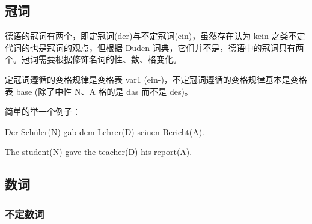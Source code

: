 \subsection{冠词}

德语的冠词有两个，即定冠词(der)与不定冠词(ein)，虽然存在认为 kein 之类不定代词的也是冠词的观点，但根据 Duden 词典，它们并不是，德语中的冠词只有两个。冠词需要根据修饰名词的性、数、格变化。

定冠词遵循的变格规律是变格表 var1 (ein-)，不定冠词遵循的变格规律基本是变格表 base (除了中性 N、A 格的是 das 而不是 des)。

简单的举一个例子：

Der Schüler(N) gab dem Lehrer(D) seinen Bericht(A).

The student(N) gave the teacher(D) his report(A).

\subsection{数词}

\subsubsection{不定数词}

